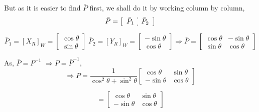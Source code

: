 \documentclass[a4paper]{article}
\begin{document}
\begin{qalist}
			But as it is easier to find $\bar{P}$ first, we shall do it by working column by column, 
			\renewcommand{\arraystretch}{1.5}
			\begin{equation}\bar{P} = \left[\begin{array}{c:c} {\bar{P}}_{1} &  {\bar{P}}_{2}\end{array}\right]\end{equation}
			
			\begin{equation}{\bar{P}}_{1} = {[{X}_{R}]}_{W} = \begin{bmatrix}\cos\theta \\ \sin\theta\end{bmatrix} \;
			{\bar{P}}_{2} = {[{Y}_{R}]}_{W} = \begin{bmatrix}-\sin\theta \\ \cos\theta\end{bmatrix}
			\Rightarrow \bar{P} = \begin{bmatrix} \cos\theta & -\sin\theta \\ \sin\theta & \cos\theta\end{bmatrix}\end{equation}
			
			As, $\bar{P} = {P}^{-1}$ $\Rightarrow P = {\bar{P}}^{-1}, $ 
			\begin{equation}
				\Rightarrow P = \frac{1}{{\cos}^{2}\theta + {\sin}^{2}\theta}\begin{bmatrix}\cos\theta & \sin\theta \\-\sin\theta & \cos\theta\end{bmatrix}
			\end{equation}
			
			\begin{equation}
				=\begin{bmatrix}\cos\theta & \sin\theta \\-\sin\theta & \cos\theta\end{bmatrix}
			\end{equation}
			

\end{qalist}
\end{document}
